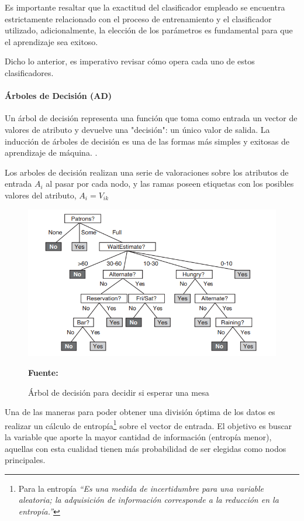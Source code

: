 Es importante resaltar que la exactitud del clasificador empleado se encuentra estrictamente relacionado con el proceso de entrenamiento y el clasificador utilizado, adicionalmente, la elección de los parámetros es fundamental para que el aprendizaje sea exitoso. \parencite[7]{Flach2012MachineLearning}

Dicho lo anterior, es imperativo revisar cómo opera cada uno de estos clasificadores.
\paragraph{Árboles de Decisión (AD)}
Un árbol de decisión representa una función que toma como entrada un vector de valores de atributo y devuelve una "decisión": un único valor de salida. La inducción de árboles de decisión es una de las formas más simples y exitosas de aprendizaje de máquina. \parencite[697]{Russel2010Artificial_Intelligence_3rd}.

Los arboles de decisión realizan una serie de valoraciones sobre los atributos de entrada $A_i$ al pasar por cada nodo, y las ramas poseen etiquetas con los posibles valores del atributo, $A_i = V_{ik}$

\begin{figure}[H]
    \centering
    \includegraphics[width=1\textwidth]{Anexos/LATEX/chapters/images/add.PNG}
    \caption{Árbol de decisión para decidir si esperar una mesa}
    \small{\textbf{Fuente:} \parencite[699]{Russel2010Artificial_Intelligence_3rd}}
    \label{add}
\end{figure}

Una de las maneras para poder obtener una división óptima de los datos es realizar un cálculo de entropía\footnote{Para \parencite[703]{Russel2010Artificial_Intelligence_3rd} la entropía \textit{“Es una medida de incertidumbre para una variable
aleatoria; la adquisición de información corresponde a la reducción en la entropía.”}} sobre el vector de entrada. El objetivo es buscar la variable que aporte la mayor cantidad de información (entropía menor), aquellas con esta cualidad tienen más probabilidad de ser elegidas como nodos principales.

